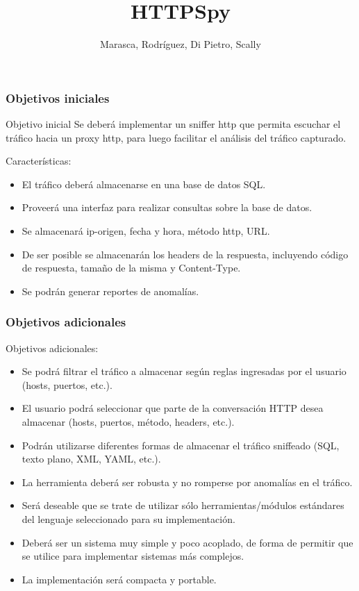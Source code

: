 \documentclass[10pt,a4paper]{beamer}
\author{Marasca, Rodríguez, Di Pietro, Scally}
\title{HTTPSpy}
\institute{FCEN, UBA}
\begin{document}
 

\maketitle

\begin{frame}
	\frametitle{Objetivos iniciales}
	\begin{block}{Objetivo inicial}
	Se deberá implementar un sniffer http que permita escuchar el tráfico hacia un proxy http, para luego facilitar el análisis del tráfico capturado.
	\end{block}
	Características:
	\begin{itemize}
		\item El tráfico deberá almacenarse en una base de datos SQL.
		\item Proveerá una interfaz para realizar consultas sobre la base de datos.
		\item Se almacenará ip-origen, fecha y hora, método http, URL.
		\item De ser posible se almacenarán los headers de la respuesta, incluyendo código de respuesta, tamaño de la misma y Content-Type.
		\item Se podrán generar reportes de anomalías.
	\end{itemize}
\end{frame}

\begin{frame}

	\frametitle{Objetivos adicionales}
	Objetivos adicionales:
	\begin{itemize}
		\item Se podrá filtrar el tráfico a almacenar según reglas ingresadas por el usuario (hosts, puertos, etc.).
		\item El usuario podrá seleccionar que parte de la conversación HTTP desea almacenar (hosts, puertos, método, headers, etc.).
		\item Podrán utilizarse diferentes formas de almacenar el tráfico sniffeado (SQL, texto plano, XML, YAML, etc.).
		\item La herramienta deberá ser robusta y no romperse por anomalías en el tráfico.
		\item Será deseable que se trate de utilizar sólo herramientas/módulos estándares del lenguaje seleccionado para su implementación.
		\item Deberá ser un sistema muy simple y poco acoplado, de forma de permitir que se utilice para implementar sistemas más complejos.
		\item La implementación será compacta y portable.
	\end{itemize}
	
\end{frame}
\end{document}
